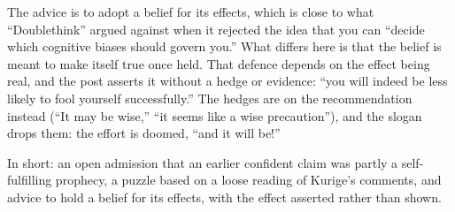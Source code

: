 \begin{afterword}
The advice is to adopt a belief for its effects, which is close to what ``Doublethink'' argued against when it rejected the idea that you can ``decide which cognitive biases should govern you.'' What differs here is that the belief is meant to make itself true once held. That defence depends on the effect being real, and the post asserts it without a hedge or evidence: ``you will indeed be less likely to fool yourself successfully.'' The hedges are on the recommendation instead (``It may be wise,'' ``it seems like a wise precaution''), and the slogan drops them: the effort is doomed, ``and it will be!''

In short: an open admission that an earlier confident claim was partly a self-fulfilling prophecy, a puzzle based on a loose reading of Kurige's comments, and advice to hold a belief for its effects, with the effect asserted rather than shown.
\end{afterword}

